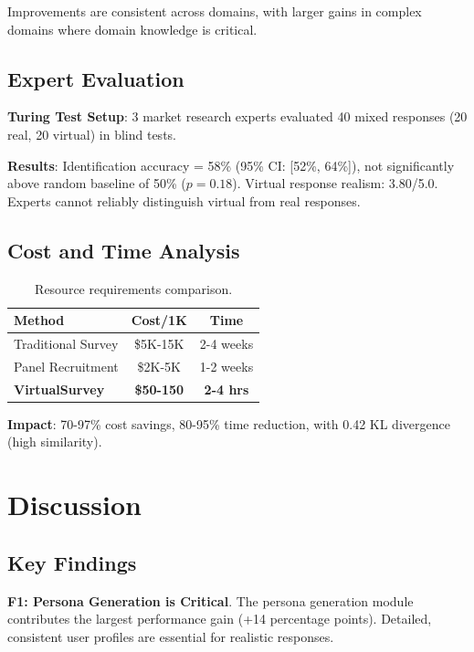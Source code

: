 \documentclass[sigconf,nonarchival]{acmart}
\begin{document}
Improvements are consistent across domains, with larger gains in complex domains where domain knowledge is critical.

\subsection{Expert Evaluation}

\textbf{Turing Test Setup}: 3 market research experts evaluated 40 mixed responses (20 real, 20 virtual) in blind tests.

\textbf{Results}: Identification accuracy = 58\% (95\% CI: [52\%, 64\%]), not significantly above random baseline of 50\% ($p = 0.18$). Virtual response realism: 3.80/5.0. Experts cannot reliably distinguish virtual from real responses.

\subsection{Cost and Time Analysis}

\begin{table}[t]
\centering
\caption{Resource requirements comparison.}
\label{tab:cost}
\small
\begin{tabular}{l|cc}
\toprule
Method & Cost/1K & Time \\
\midrule
Traditional Survey & \$5K-15K & 2-4 weeks \\
Panel Recruitment & \$2K-5K & 1-2 weeks \\
\textbf{VirtualSurvey} & \textbf{\$50-150} & \textbf{2-4 hrs} \\
\bottomrule
\end{tabular}
\end{table}

\textbf{Impact}: 70-97\% cost savings, 80-95\% time reduction, with 0.42 KL divergence (high similarity).


\section{Discussion}

\subsection{Key Findings}

\textbf{F1: Persona Generation is Critical}. The persona generation module contributes the largest performance gain (+14 percentage points). Detailed, consistent user profiles are essential for realistic responses.
\end{document}
